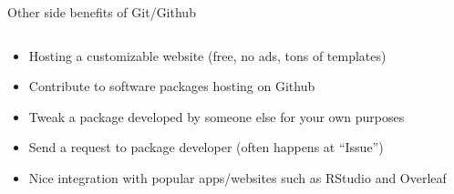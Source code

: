 \documentclass[handout,pdftex,10pt,aspectratio=169]{beamer}
\begin{document}
\begin{frame}{Other side benefits of Git/Github}
  \begin{columns}[c]
    \begin{column}{0.46\linewidth}
      \begin{itemize}\setlength\itemsep{10pt}
        \item<1-> Hosting a customizable website (free, no ads, tons of templates)
        \item<2-> Contribute to software packages hosting on Github
        \item<3-> Tweak a package developed by someone else for your own purposes
        \item<4-> Send a request to package developer (often happens at ``Issue'')
        \item<5-> Nice integration with popular apps/websites such as RStudio and Overleaf
      \end{itemize}
    \end{column}\hfill
    \begin{column}{0.53\linewidth}
      \centering

\end{column}
\end{columns}
\end{frame}
\end{document}
